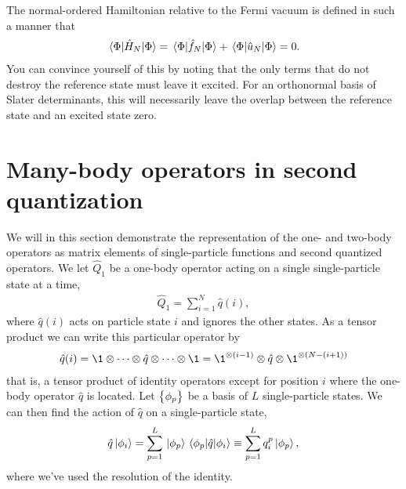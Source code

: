         The normal-ordered Hamiltonian relative to the Fermi vacuum is defined
        in such a manner that
        \begin{align}
            \mel*{\Phi}{\hat{H}_N}{\Phi}
            = \mel*{\Phi}{\hat{f}_N}{\Phi}
            + \mel*{\Phi}{\hat{u}_N}{\Phi}
            = 0.
        \end{align}
        You can convince yourself of this by noting that the only terms that
        do not destroy the reference state must leave it excited.
        For an orthonormal basis of Slater determinants, this will necessarily
        leave the overlap between the reference state and an excited state zero.

    \section{Many-body operators in second quantization}
        \label{app:operator-representation}
        We will in this section demonstrate the representation of the one- and
        two-body operators as matrix elements of single-particle functions and
        second quantized operators.
        We let $\hat{Q}_1$ be a one-body operator acting on a single
        single-particle state at a time,
        \begin{align}
            \hat{Q}_1
            = \sum_{i = 1}^{N}\hat{q}(i),
        \end{align}
        where $\hat{q}(i)$ acts on particle state $i$ and ignores the other
        states.
        As a tensor product we can write this particular operator by
        \begin{align}
            \hat{q}(i)
            = \1\otimes
            \dots\otimes\hat{q}\otimes\dots\otimes\1
            = \1^{\otimes (i - 1)}
            \otimes\hat{q}
            \otimes\1^{\otimes (N - (i + 1))}
            \label{eq:tensor-one-body}
        \end{align}
        that is, a tensor product of identity operators except for position $i$
        where the one-body operator $\hat{q}$ is located.
        Let $\left\{ \phi_p \right\}$ be a basis of $L$ single-particle states.
        We can then find the action of $\hat{q}$ on a single-particle state,
        \begin{align}
            \hat{q}\ket*{\phi_i}
            = \sum_{p = 1}^{L}\ket*{\phi_{p}}\mel*{\phi_p}{\hat{q}}{\phi_i}
            \equiv \sum_{p = 1}^{L} q^{p}_{i}\ket*{\phi_p},
        \end{align}
        where we've used the resolution of the identity.
